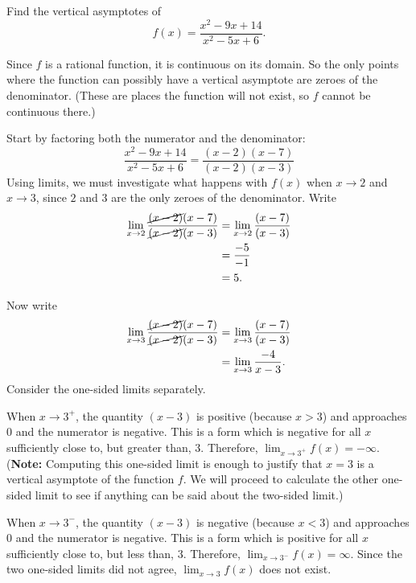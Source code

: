 \documentclass{ximera}
\begin{document}
\begin{example}
	Find the vertical asymptotes of 
	\[ f(x) = \frac{x^2-9x+14}{x^2-5x+6}. \]

\begin{explanation}
Since $f$ is a rational function, it is continuous on its domain. So the only points where the function can possibly have a vertical asymptote are zeroes 
of the denominator. (These are places the function will not exist, so $f$ cannot be continuous there.)

Start by factoring both the numerator and the denominator:
\[
\frac{x^2-9x+14}{x^2-5x+6} = \frac{(x-2)(x-7)}{(x-2)(x-3)}
\]
Using limits, we must investigate what happens with $ f(x)$ when $x\to 2$ and $x\to 3$, since $2$ and $3$ are the only zeroes of the denominator. Write
\begin{align*}
	\lim_{x\to 2} \frac{\cancel{(x-2)}(x-7)}{\cancel{(x-2)}(x-3)} &= \lim_{x\to 2} \frac{(x-7)}{(x-3)}\\
		&= \frac{-5}{-1}\\
		&=5.
\end{align*}

Now write
\begin{align*}
	\lim_{x\to 3} \frac{\cancel{(x-2)}(x-7)}{\cancel{(x-2)}(x-3)} &= \lim_{x\to 3} \frac{(x-7)}{(x-3)}\\
		&= \lim_{x\to 3}\frac{-4}{x-3}.
\end{align*}
Consider the one-sided limits separately. 

When $x\to 3^+$, the quantity $(x-3)$ is positive (because $x>3$) and approaches $0$ and the numerator is negative. This is a \numOverZero form which is negative for all $x$ sufficiently close to, but greater than, $3$. Therefore, $\displaystyle \lim_{x\to 3^+} f(x) = -\infty$.
(\textbf{Note:} Computing this one-sided limit is enough to justify that $x=3$ is a vertical asymptote of the function $f$. We will proceed to calculate the other one-sided limit to see if anything can be said about the two-sided limit.)


When $x\to 3^-$, the quantity $(x-3)$ is negative (because $x<3$) and approaches $0$ and the numerator is negative. This is a \numOverZero form which is positive for all $x$ sufficiently close to, but less than, $3$. Therefore, $\displaystyle \lim_{x\to 3^-} f(x) = \infty$. Since the two one-sided limits did not agree, $\displaystyle \lim_{x\to 3}f(x)$ does not exist.


\end{explanation}
\end{example}
\end{document}
